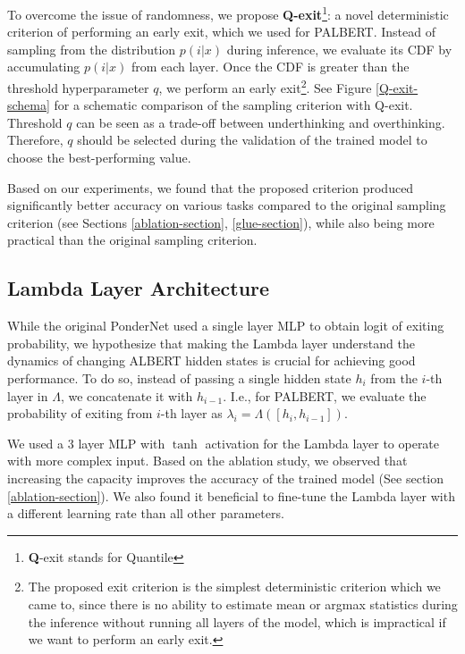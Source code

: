 \documentclass{article}
\begin{document}
To overcome the issue of randomness, we propose \textbf{Q-exit}\footnote{\textbf{Q}-exit stands for Quantile}: a novel deterministic criterion of performing an early exit, which we used for PALBERT. Instead of sampling from the distribution $p(i|x)$ during inference, we evaluate its CDF by accumulating $p(i|x)$ from each layer. Once the CDF is greater than the threshold hyperparameter $q$, we perform an early exit\footnote{The proposed exit criterion is the simplest deterministic criterion which we came to, since there is no ability to estimate mean or argmax statistics during the inference without running all layers of the model, which is impractical if we want to perform an early exit.}. See Figure \ref{Q-exit-schema} for a schematic comparison of the sampling criterion with Q-exit. Threshold $q$ can be seen as a trade-off between underthinking and overthinking. Therefore, $q$ should be selected during the validation of the trained model to choose the best-performing value.

Based on our experiments, we found that the proposed criterion produced significantly better accuracy on various tasks compared to the original sampling criterion (see Sections \ref{ablation-section}, \ref{glue-section}), while also being more practical than the original sampling criterion.


\subsection{Lambda Layer Architecture}
While the original PonderNet used a single layer MLP to obtain logit of exiting probability, we hypothesize that making the Lambda layer understand the dynamics of changing ALBERT hidden states is crucial for achieving good performance. To do so, instead of passing a single hidden state $h_i$ from the $i$-th layer in $\Lambda$, we concatenate it with $h_{i - 1}$. I.e., for PALBERT, we evaluate the probability of exiting from $i$-th layer as $\lambda_i = \Lambda([h_i, h_{i - 1}])$.


We used a $3$ layer MLP with $\tanh$ activation for the Lambda layer to operate with more complex input. Based on the ablation study, we observed that increasing the capacity improves the accuracy of the trained model (See section \ref{ablation-section}). We also found it beneficial to fine-tune the Lambda layer with a different learning rate than all other parameters.
\end{document}

